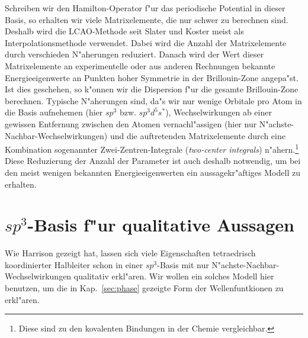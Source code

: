 Schreiben wir den Hamilton-Operator f"ur das periodische Potential in
dieser Basis, so erhalten wir viele Matrixelemente, die nur schwer zu
berechnen sind. Deshalb wird die LCAO-Methode seit Slater und Koster
\cite{slko:54} meist als Interpolationsmethode verwendet. Dabei wird die
Anzahl der Matrixelemente durch verschieden N"aherungen reduziert. Danach wird
der Wert dieser Matrixelemente an experimentelle oder aus anderen Rechnungen
bekannte Energieeigenwerte an Punkten hoher Symmetrie in der Brillouin-Zone
angepa"st. Ist dies geschehen, so k"onnen wir die Dispersion f"ur die
gesamte Brillouin-Zone berechnen. Typische N"aherungen sind, da"s wir
nur wenige Orbitale pro Atom in die Basis aufnehemen (hier $sp^{3}$
bzw. $sp^{3}d^{5}s^{\ast}$), Wechselwirkungen ab einer gewissen Entfernung
zwischen den Atomen vernachl"assigen (hier nur
N"achste-Nachbar-Wechselwirkungen) und die auftretenden Matrixelemente durch
eine Kombination 
sogenannter Zwei-Zentren-Integrale (\emph{two-center integrals})
n"ahern.\footnote{Diese sind zu den kovalenten Bindungen in der Chemie
  vergleichbar.} 
Diese Reduzierung der Anzahl der Parameter ist auch deshalb notwendig, um bei
den meist wenigen bekannten Energieeigenwerten ein aussagekr"aftiges Modell zu
erhalten.%

\section{$sp^{3}$-Basis f"ur qualitative Aussagen}
\label{sec:sp3}

Wie Harrison \cite{harr:80} gezeigt hat, lassen sich viele Eigenschaften
tetraedrisch koordinierter Halbleiter schon in einer $sp^{3}$-Basis mit nur
N"achste-Nachbar-Wechselwirkungen qualitativ erkl"aren. Wir wollen ein
solches Modell hier benutzen, um die in Kap.~\ref{sec:phase} gezeigte Form
der Wellenfuntkionen zu erkl"aren.

